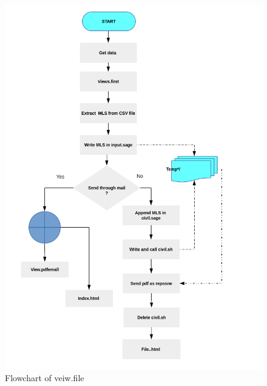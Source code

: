 \begin{figure}[!h]
\centering \includegraphics[scale=0.27]{images/flowchartfile.png}
\caption{Flowchart of veiw.file}
\end{figure}

\newpage
